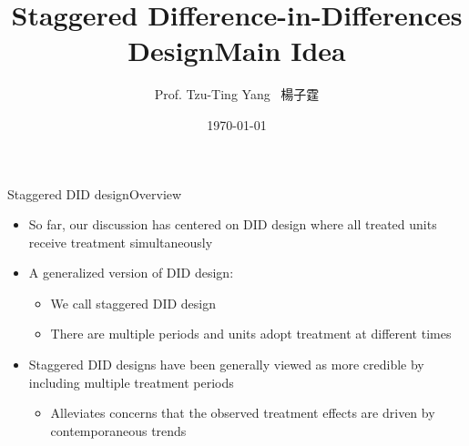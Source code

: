 \documentclass[dvipsnames,hyperref={pdfpagelabels=false}]{beamer}
\title[]
{Staggered Difference-in-Differences Design}
\author
{Prof. Tzu-Ting Yang  \ 楊子霆}
\institute{Institute of Economics, Academia Sinica  \ 中央研究院經濟研究所}
\date
{\today}
\begin{document}
	
	
	\begin{frame}{}
	\titlepage
\end{frame}






\title[]  
{Main Idea}


\author 
{}

\institute{}






\date
{}


\begin{frame}{}
\titlepage
\end{frame}


\begin{frame}{Staggered DID design}{Overview}
	\begin{itemize}
		
	\item So far, our discussion has centered on DID design where all treated units receive treatment simultaneously	
			\vspace{0.2cm}
		
	\item A generalized version of DID design: 
	\vspace{0.2cm}
	\begin{itemize}
		
		\item We call staggered DID design
		\vspace{0.2cm}
		\item There are multiple periods and units adopt treatment at different times 
		\vspace{0.2cm}
	\end{itemize}
	\item Staggered DID designs have been generally viewed as more credible by including multiple treatment periods
\vspace{0.2cm}
\begin{itemize}
	\item Alleviates concerns that the observed
	treatment effects are driven by contemporaneous trends 
\end{itemize}

	\end{itemize}
\end{frame}
\end{document}
